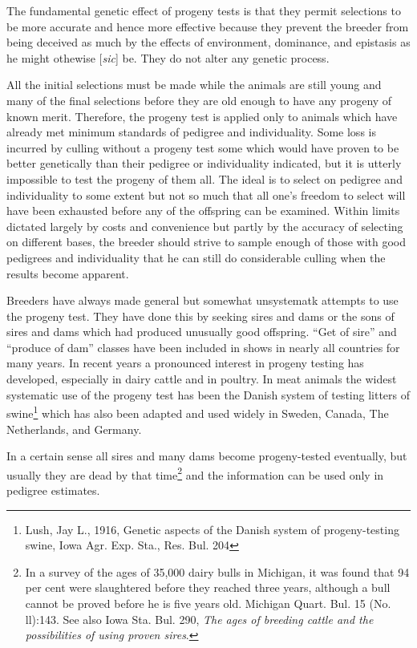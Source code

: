 The fundamental genetic effect of progeny tests is that they permit
selections to be more accurate and hence more effective because they
prevent the breeder from being deceived as much by the effects of environment,
dominance, and epistasis as he might othewise [\textit{sic}] be. They do
not alter any genetic process.

All the initial selections must be made while the animals are still
young and many of the final selections before they are old enough to
have any progeny of known merit. Therefore, the progeny test is
applied only to animals which have already met minimum standards of
pedigree and individuality. Some loss is incurred by culling without a
progeny test some which would have proven to be better genetically
than their pedigree or individuality indicated, but it is utterly impossible
to test the progeny of them all. The ideal is to select on pedigree
and individuality to some extent but not so much that all one's freedom
to select will have been exhausted before any of the offspring can be
examined. Within limits dictated largely by costs and convenience but
partly by the accuracy of selecting on different bases, the breeder should
strive to sample enough of those with good pedigrees and individuality
that he can still do considerable culling when the results become
apparent.

Breeders have always made general but somewhat unsystematk
attempts to use the progeny test. They have done this by seeking sires
and dams or the sons of sires and dams which had produced unusually
good offspring. ``Get of sire'' and ``produce of dam'' classes have been
included in shows in nearly all countries for many years. In recent
years a pronounced interest in progeny testing has developed, especially
in dairy cattle and in poultry. In meat animals the widest systematic
use of the progeny test has been the Danish system of testing litters of
swine\footnote{Lush, Jay L., 1916, Genetic aspects of the Danish system
of progeny-testing swine, Iowa Agr. Exp. Sta., Res. Bul. 204} which has
also been adapted and used widely in Sweden, Canada, The Netherlands, and Germany.

In a certain sense all sires and many dams become progeny-tested
eventually, but usually they are dead by that time\footnote{In a survey of the
ages of 35,000 dairy bulls in Michigan, it was found that 94 per cent were
slaughtered before they reached three years, although a bull cannot be
proved before he is five years old. Michigan Quart. Bul. 15 (No. ll):143. See also
Iowa Sta. Bul. 290, \textit{The ages of breeding cattle and the possibilities of using proven
sires}.} and the information can be used only in pedigree estimates.

